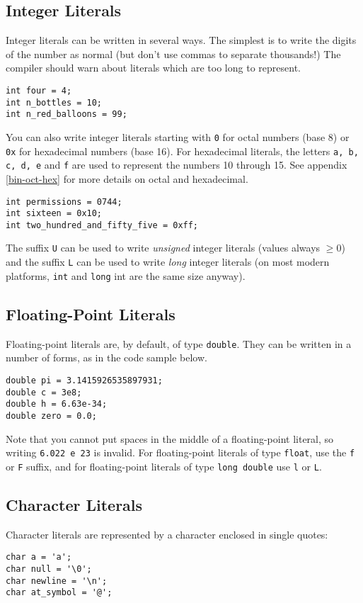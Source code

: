 \documentclass[a4paper]{scrartcl}
\begin{document}
\subsection{Integer Literals}
Integer literals can be written in several ways. The simplest is to write the digits of the number as normal (but don't use commas to separate thousands!) The compiler should warn about literals which are too long to represent.
\begin{verbatim}
int four = 4;
int n_bottles = 10;
int n_red_balloons = 99;
\end{verbatim}

You can also write integer literals starting with \texttt{0} for octal numbers (base 8) or \texttt{0x} for hexadecimal numbers (base 16). For hexadecimal literals, the letters \texttt{a, b, c, d, e} and \texttt{f} are used to represent the numbers 10 through 15. See appendix \ref{bin-oct-hex} for more details on octal and hexadecimal.

\begin{verbatim}
int permissions = 0744;
int sixteen = 0x10;
int two_hundred_and_fifty_five = 0xff;
\end{verbatim}

The suffix \texttt{U} can be used to write \emph{unsigned} integer literals (values always $\ge 0$) and the suffix \texttt{L} can be used to write \emph{long} integer literals (on most modern platforms, \texttt{int} and \texttt{long} int are the same size anyway).

\subsection{Floating-Point Literals}
Floating-point literals are, by default, of type \texttt{double}. They can be written in a number of forms, as in the code sample below.
\begin{verbatim}
double pi = 3.1415926535897931;
double c = 3e8;
double h = 6.63e-34;
double zero = 0.0;
\end{verbatim}

Note that you cannot put spaces in the middle of a floating-point literal, so writing \texttt{6.022 e 23} is invalid. For floating-point literals of type \texttt{float}, use the \texttt{f} or \texttt{F} suffix, and for floating-point literals of type \texttt{long double} use \texttt{l} or \texttt{L}.

\subsection{Character Literals}
Character literals are represented by a character enclosed in single quotes:
\begin{verbatim}
char a = 'a';
char null = '\0';
char newline = '\n';
char at_symbol = '@';
\end{verbatim}
\end{document}
